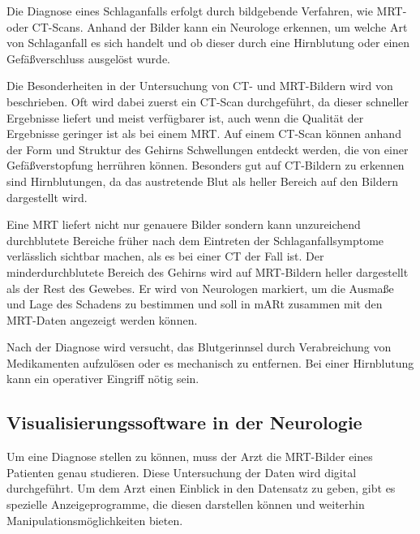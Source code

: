Die Diagnose eines Schlaganfalls erfolgt durch bildgebende Verfahren, wie MRT- oder CT-Scans. Anhand der Bilder kann ein Neurologe erkennen, um welche Art von Schlaganfall es sich handelt und ob dieser durch eine Hirnblutung oder einen Gefäßverschluss ausgelöst wurde. 

Die Besonderheiten in der Untersuchung von CT- und MRT-Bildern wird von \cite{schlaganfallBilder} beschrieben.
Oft wird dabei zuerst ein CT-Scan durchgeführt, da dieser schneller Ergebnisse liefert und meist verfügbarer ist, auch wenn die Qualität der Ergebnisse geringer ist als bei einem MRT. 
Auf einem CT-Scan können anhand der Form und Struktur des Gehirns Schwellungen entdeckt werden, die von einer Gefäßverstopfung herrühren können. Besonders gut auf CT-Bildern zu erkennen sind Hirnblutungen, da das austretende Blut als heller Bereich auf den Bildern dargestellt wird. 

Eine MRT liefert nicht nur genauere Bilder sondern kann unzureichend durchblutete Bereiche früher nach dem Eintreten der Schlaganfallsymptome verlässlich sichtbar machen, als es bei einer CT der Fall ist.
Der minderdurchblutete Bereich des Gehirns wird auf MRT-Bildern heller dargestellt als der Rest des Gewebes. Er wird von Neurologen markiert, um die Ausmaße und Lage des Schadens zu bestimmen und soll in mARt zusammen mit den MRT-Daten angezeigt werden können.

Nach der Diagnose wird versucht, das Blutgerinnsel durch Verabreichung von Medikamenten aufzulösen oder es mechanisch zu entfernen. Bei einer Hirnblutung kann ein operativer Eingriff nötig sein.
\cite{schlaganfallBehandlung}

\subsection{Visualisierungssoftware in der Neurologie}
\label{radiologieSoftware}
Um eine Diagnose stellen zu können, muss der Arzt die MRT-Bilder eines Patienten genau studieren. Diese Untersuchung der Daten wird digital durchgeführt. Um dem Arzt einen Einblick in den Datensatz zu geben, gibt es spezielle Anzeigeprogramme, die diesen darstellen können und weiterhin Manipulationsmöglichkeiten bieten. 
  
